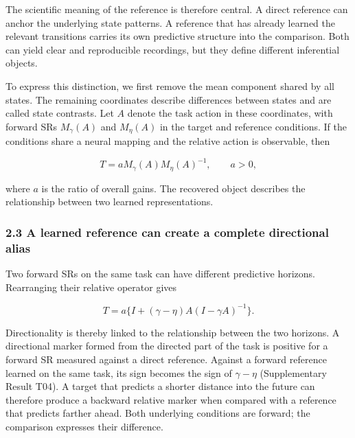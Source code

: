 \documentclass[11pt,a4paper]{article}
\begin{document}
The scientific meaning of the reference is therefore central. A direct
reference can anchor the underlying state patterns. A reference that has
already learned the relevant transitions carries its own predictive
structure into the comparison. Both can yield clear and reproducible
recordings, but they define different inferential objects.

\par
\noindent\begin{minipage}{\linewidth}

To express this distinction, we first remove the mean component shared
by all states. The remaining coordinates describe differences between
states and are called state contrasts. Let \(A\) denote the task action
in these coordinates, with forward SRs \(M_\gamma(A)\) and \(M_\eta(A)\)
in the target and reference conditions. If the conditions share a neural
mapping and the relative action is observable, then

\[
T=aM_\gamma(A)M_\eta(A)^{-1},\qquad a>0,
\]

\end{minipage}\par

where \(a\) is the ratio of overall gains. The recovered object
describes the relationship between two learned representations.

\subsubsection{2.3 A learned reference can create a complete directional
alias}\label{a-learned-reference-can-create-a-complete-directional-alias}

\par
\noindent\begin{minipage}{\linewidth}

Two forward SRs on the same task can have different predictive horizons.
Rearranging their relative operator gives

\[
T=a\{I+(\gamma-\eta)A(I-\gamma A)^{-1}\}.
\]

\end{minipage}\par

Directionality is thereby linked to the relationship between the two
horizons. A directional marker formed from the directed part of the task
is positive for a forward SR measured against a direct reference.
Against a forward reference learned on the same task, its sign becomes
the sign of \(\gamma-\eta\) (Supplementary Result T04). A target that
predicts a shorter distance into the future can therefore produce a
backward relative marker when compared with a reference that predicts
farther ahead. Both underlying conditions are forward; the comparison
expresses their difference.
\end{document}
